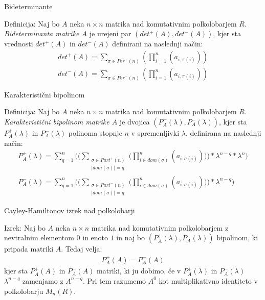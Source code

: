 \documentclass[t, 12pt]{beamer} %
\newcommand{\abs}[1]{\ensuremath{\lvert #1 \rvert}}
\newcommand{\pojem}[1]{\emph{#1}}
\newcommand{\fillblack}[1]{
\begin{tikzpicture}[remember picture, overlay]
    \node [shift={(0 cm,0cm)}]  at (current page.south west)
        {%
        \begin{tikzpicture}[remember picture, overlay] at (current page.south west)
            \draw [fill=black] (0, 0) -- (0,#1 \paperheight) --
                              (\paperwidth,#1 \paperheight) -- (\paperwidth,0) -- cycle ;
        \end{tikzpicture}
        };
        \draw (current page.north west) rectangle (current page.south east);
\end{tikzpicture}
}
\begin{document}
\begin{frame}{Bideterminante}
	\begin{block}{Definicija:}
			Naj bo $A$ neka $n\times n$ matrika nad komutativnim polkolobarjem $R$. \pojem{Bideterminanta matrike $A$} je urejeni par $(det^{+}(A), det^{-}(A))$, kjer sta vrednosti $det^{+}(A)$ in $det^{-}(A)$ definirani na naslednji način:
			\begin{align*}
				det^{+}(A) = \sum_{\pi\in Per^{+}(n)}(\prod_{i = 1}^{n}(a_{i,\pi(i)})) \\
				det^{-}(A) = \sum_{\pi\in Per^{-}(n)}(\prod_{i = 1}^{n}(a_{i,\pi(i)}))
			\end{align*}
	\end{block}
\end{frame}

\begin{frame}{Karakteristični bipolinom}
	\begin{block}{Definicija:}
		Naj bo $A$ neka $n\times n$ matrika nad komutativnim polkolobarjem $R$. \pojem{Karakteristični bipolinom matrike $A$} je dvojica $(P^{+}_A(\lambda), P^{-}_A(\lambda))$, kjer sta $P^{+}_A(\lambda)$ in $P^{-}_A(\lambda)$ polinoma stopnje $n$ v spremenljivki $\lambda$, definirana na naslednji način:
		\begin{align*}
			P^{+}_A(\lambda) = \sum_{q = 1}^{n}\bigg(\bigg( \sum_{\substack{\sigma\in Part^{+}(n) \\ \abs{dom(\sigma)} = q}} \bigg(\prod_{i\in dom(\sigma)}^{n} (a_{i, \sigma(i)})\bigg)\bigg) *\lambda^{n-q} *\lambda^n \bigg) \\
			P^{-}_A(\lambda) = \sum_{q = 1}^{n}\bigg(\bigg( \sum_{\substack{\sigma\in Part^{-}(n) \\ \abs{dom(\sigma)} = q}} \bigg(\prod_{i\in dom(\sigma)}^{n} (a_{i, \sigma(i)})\bigg)\bigg) *\lambda^{n-q}\bigg)
		\end{align*}
	\end{block}
\end{frame}

\begin{frame}{Cayley-Hamiltonov izrek nad polkolobarji}
	\begin{block}{Izrek:}
		Naj bo $A$ neka $n\times n$ matrika nad komutativnim polkolobarjem z nevtralnim elementom $0$ in enoto $1$ in naj bo $(P^{+}_A(\lambda), P^{-}_A(\lambda))$ bipolinom, ki pripada matriki $A$. Tedaj velja: \begin{align}
			P^{+}_A(A) = P^{-}_A(A)
		\end{align}
		kjer sta $P^{+}_A(A)$ in $P^{-}_A(A)$ matriki, ki ju dobimo, če v $P^{+}_A(\lambda)$ in $P^{-}_A(\lambda)$ $\lambda^{n-q}$ zamenjamo z $A^{n-q}$. Pri tem razumemo $A^0$ kot multiplikativno identiteto v polkolobarju $M_n(R)$.
	\end{block}
\end{frame}
\end{document}
